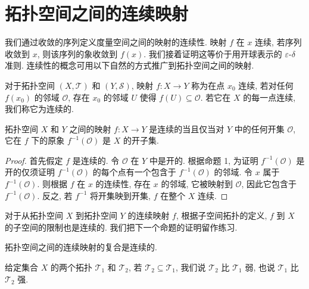 \documentclass[../../main.tex]{subfiles}
\begin{document}
\section{拓扑空间之间的连续映射}\label{section:ch11-连续映射}

我们通过收敛的序列定义度量空间之间的映射的连续性. 映射 $f$ 在 $x$ 连续, 若序列收敛到 $x$, 则该序列的象收敛到 $f(x)$. 我们接着证明这等价于用开球表示的 $\varepsilon$-$\delta$ 准则. 连续性的概念可用以下自然的方式推广到拓扑空间之间的映射.

\begin{definition}[连续映射]\label{definition:ch11-连续映射}
对于拓扑空间 $(X,\mathcal{T})$ 和 $(Y,\mathcal{S})$, 映射 $f:X\to Y$ 称为在点 $x_{0}$ 连续, 若对任何 $f(x_{0})$ 的邻域 $\mathcal{O}$, 存在 $x_{0}$ 的邻域 $U$ 使得 $f(U)\subseteq\mathcal{O}$. 若它在 $X$ 的每一点连续, 我们称它为连续的.
\end{definition}

\begin{proposition}\label{proposition:ch11-连续原象}
拓扑空间 $X$ 和 $Y$ 之间的映射 $f:X\to Y$ 是连续的当且仅当对 $Y$ 中的任何开集 $\mathcal{O}$, 它在 $f$ 下的原象 $f^{-1}(\mathcal{O})$ 是 $X$ 的开子集.
\end{proposition}

\begin{proof}
首先假定 $f$ 是连续的. 令 $\mathcal{O}$ 在 $Y$ 中是开的. 根据命题 1, 为证明 $f^{-1}(\mathcal{O})$ 是开的仅须证明 $f^{-1}(\mathcal{O})$ 的每个点有一个包含于 $f^{-1}(\mathcal{O})$ 的邻域. 令 $x$ 属于 $f^{-1}(\mathcal{O})$. 则根据 $f$ 在 $x$ 的连续性, 存在 $x$ 的邻域, 它被映射到 $\mathcal{O}$, 因此它包含于 $f^{-1}(\mathcal{O})$. 反之, 若 $f^{-1}$ 将开集映到开集, $f$ 在整个 $X$ 连续.
\end{proof}

对于从拓扑空间 $X$ 到拓扑空间 $Y$ 的连续映射 $f$, 根据子空间拓扑的定义, $f$ 到 $X$ 的子空间的限制也是连续的. 我们把下一个命题的证明留作练习.

\begin{proposition}\label{proposition:ch11-连续复合}
拓扑空间之间的连续映射的复合是连续的.
\end{proposition}

\begin{definition}[拓扑的强弱]\label{definition:ch11-拓扑强弱}
给定集合 $X$ 的两个拓扑 $\mathcal{T}_{1}$ 和 $\mathcal{T}_{2}$, 若 $\mathcal{T}_{2}\subseteq\mathcal{T}_{1}$, 我们说 $\mathcal{T}_{2}$ 比 $\mathcal{T}_{1}$ 弱, 也说 $\mathcal{T}_{1}$ 比 $\mathcal{T}_{2}$ 强.
\end{definition}
\end{document}
